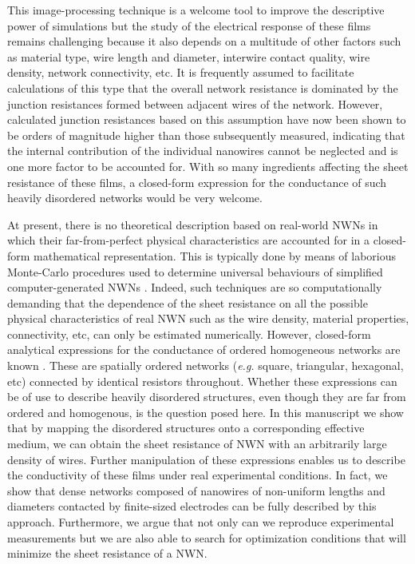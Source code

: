 This image-processing technique is a welcome tool to improve the descriptive power of simulations but the study of the electrical response of these films remains challenging because it also depends on a multitude of other factors such as material type, wire length and diameter, interwire contact quality, wire density, network connectivity, etc. It is frequently assumed to facilitate calculations of this type that the overall network resistance is dominated by the junction resistances formed between adjacent wires of the network\cite{mutiso2013}.  However, calculated junction resistances based on this assumption have now been shown to be orders of magnitude higher than those subsequently measured\cite{bellew2015}, indicating that the internal contribution of the individual nanowires cannot be neglected and is one more factor to be accounted for. With so many ingredients affecting the sheet resistance of these films, a closed-form expression for the conductance of such heavily disordered networks would be very welcome. 

At present, there is no theoretical description based on real-world NWNs in which their far-from-perfect physical characteristics are accounted for in a closed-form mathematical representation. This is typically done by means of laborious Monte-Carlo procedures used to determine universal behaviours of simplified computer-generated NWNs  \cite{pike1974,li2009,zezelj2012,ashkan2007}. Indeed, such techniques are so computationally demanding that the dependence of the sheet resistance on all the possible physical characteristics of real NWN such as the wire density, material properties, connectivity, etc, can only be estimated numerically. However, closed-form analytical expressions for the conductance of ordered homogeneous networks are known \cite{cserti2000}. These are spatially ordered networks ({\it e.g.}  square, triangular, hexagonal, etc) connected by identical resistors throughout. Whether these expressions can be of use to describe heavily disordered structures, even though they are far from ordered and homogenous, is the question posed here. In this manuscript we show that by mapping the disordered structures onto a corresponding effective medium, we can obtain the sheet resistance of NWN with an arbitrarily large density of wires. Further manipulation of these expressions enables us to describe the conductivity of these films under real experimental conditions. In fact, we show that dense networks composed of nanowires of non-uniform lengths and diameters contacted by finite-sized electrodes can be fully described by this approach. Furthermore, we argue that not only can we reproduce experimental measurements but we are also able to search for optimization conditions that will minimize the sheet resistance of a NWN.
 

